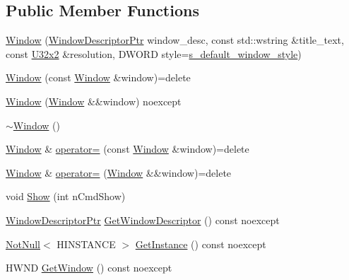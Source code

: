 \subsection*{Public Member Functions}
\begin{DoxyCompactItemize}
\item 
\mbox{\hyperlink{classmage_1_1_window_a70ace8ee3d82233fc06a1476ac5f56a6}{Window}} (\mbox{\hyperlink{classmage_1_1_window_ac41b052d8e8dd0571b3ec862e8f6da05}{Window\+Descriptor\+Ptr}} window\+\_\+desc, const std\+::wstring \&title\+\_\+text, const \mbox{\hyperlink{namespacemage_a31f2bb52b5080e706e1c13de07c0a249}{U32x2}} \&resolution, D\+W\+O\+RD style=\mbox{\hyperlink{classmage_1_1_window_ac680bdd3d5359f66b2dea082ef45e0da}{s\+\_\+default\+\_\+window\+\_\+style}})
\item 
\mbox{\hyperlink{classmage_1_1_window_a910a63ff907559e693cb9abd3539523e}{Window}} (const \mbox{\hyperlink{classmage_1_1_window}{Window}} \&window)=delete
\item 
\mbox{\hyperlink{classmage_1_1_window_a32878487dd2e2f46eaaf97aaf220ee33}{Window}} (\mbox{\hyperlink{classmage_1_1_window}{Window}} \&\&window) noexcept
\item 
\mbox{\hyperlink{classmage_1_1_window_a71d3ce0b3141e89121ae09e8fc64a217}{$\sim$\+Window}} ()
\item 
\mbox{\hyperlink{classmage_1_1_window}{Window}} \& \mbox{\hyperlink{classmage_1_1_window_ab62aeec5dee0c36b9926894e2684ff3d}{operator=}} (const \mbox{\hyperlink{classmage_1_1_window}{Window}} \&window)=delete
\item 
\mbox{\hyperlink{classmage_1_1_window}{Window}} \& \mbox{\hyperlink{classmage_1_1_window_aa52284540a75c98a2aa768a5d6410378}{operator=}} (\mbox{\hyperlink{classmage_1_1_window}{Window}} \&\&window)=delete
\item 
void \mbox{\hyperlink{classmage_1_1_window_a017de58a756a2cc4dde0ccb3caf589ff}{Show}} (int n\+Cmd\+Show)
\item 
\mbox{\hyperlink{classmage_1_1_window_ac41b052d8e8dd0571b3ec862e8f6da05}{Window\+Descriptor\+Ptr}} \mbox{\hyperlink{classmage_1_1_window_add5b20d191810ba04000728c7517543f}{Get\+Window\+Descriptor}} () const noexcept
\item 
\mbox{\hyperlink{namespacemage_a8769f9d670d6b585ea306cb1062af94b}{Not\+Null}}$<$ H\+I\+N\+S\+T\+A\+N\+CE $>$ \mbox{\hyperlink{classmage_1_1_window_a809eff149af9fd2e66eec176078d0127}{Get\+Instance}} () const noexcept
\item 
H\+W\+ND \mbox{\hyperlink{classmage_1_1_window_a0f791c3fb8f5be34a17ae2a93767a613}{Get\+Window}} () const noexcept

\end{DoxyCompactItemize}
